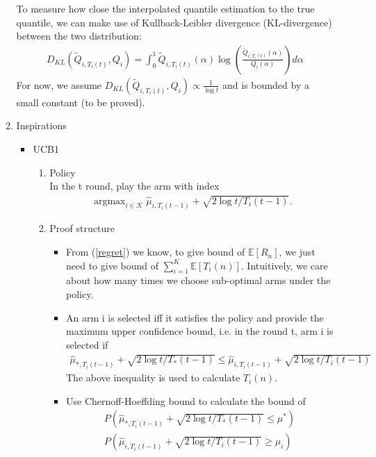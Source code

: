 \documentclass{article}
\DeclareMathOperator*{\argmax}{argmax}
\begin{document}
\begin{enumerate}
\begin{enumerate}
To measure how close the interpolated quantile estimation to the true quantile, we can make use of Kullback-Leibler divergence (KL-divergence) between the two distribution:
\begin{align}
    D_{KL} (\tilde{Q}_{i,T_i(t)}, Q_{i}) = \int_{0}^{1} \tilde{Q}_{i,T_i(t)}(\alpha) \log (\frac{\tilde{Q}_{i,T_i(t)}(\alpha)}{Q_{i}(\alpha)}) d \alpha
\end{align}
For now, we assume $D_{KL} (\tilde{Q}_{i,T_i(t)}, Q_{i}) \propto \frac{1}{\log t}$ and is bounded by a small constant (to be proved).
   \item Inspirations\\
    \begin{itemize}
        \item UCB1\\
            \begin{enumerate}
                \item Policy\\
                In the t round, play the arm with index
                    \begin{align}
                    \argmax_{i \in \mathcal{K}} \hat{\mu}_{i,T_i(t-1)} + \sqrt{2 \log t/ T_i(t-1)}.
                    \end{align}
                
                \item Proof structure\\
                    \begin{itemize}
                        \item From (\ref{regret}) we know, to give bound of $\mathbb{E}[R_n]$, we just need to give bound of $\sum_{i=1}^K \mathbb{E}[T_i(n)]$. Intuitively, we care about how many times we choose sub-optimal arms under the policy.
                        \item An arm i is selected iff it satisfies the policy and provide the maximum upper confidence bound, i.e. in the round t, arm i is selected if
                            \begin{align}
                                \hat{\mu}_{\ast,T_i(t-1)} + \sqrt{2 \log t/ T_\ast(t-1)}
                                 \leq  \hat{\mu}_{i,T_i(t-1)} + \sqrt{2 \log t/ T_i(t-1)}
                            \end{align}
                        The above inequality is used to calculate $T_i(n)$. 
                        \item Use Chernoff-Hoeffding bound to calculate the bound of 
                        \begin{align}
                            P(\hat{\mu}_{\ast,T_i(t-1)} + \sqrt{2 \log t/ T_\ast(t-1)} \leq \mu^\ast)\\
                            P(\hat{\mu}_{i,T_i(t-1)} + \sqrt{2 \log t/ T_i(t-1)} \geq \mu_i)
                        \end{align}
                    \end{itemize}
                    

\end{enumerate}
\end{itemize}
\end{enumerate}
\end{enumerate}
\end{document}
